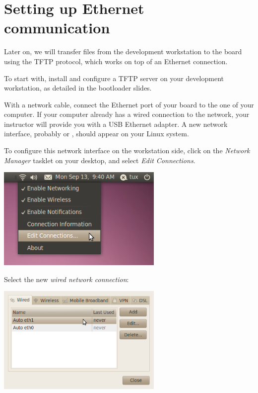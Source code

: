 \section{Setting up Ethernet communication}

Later on, we will transfer files from the development workstation to
the board using the TFTP protocol, which works on top of an Ethernet
connection.

To start with, install and configure a TFTP server on your development
workstation, as detailed in the bootloader slides.

With a network cable, connect the Ethernet port of your board to the
one of your computer. If your computer already has a wired connection
to the network, your instructor will provide you with a USB Ethernet
adapter. A new network interface, probably  or ,
should appear on your Linux system.

To configure this network interface on the workstation side, click on
the {\em Network Manager} tasklet on your desktop, and select {\em
  Edit Connections}.

\begin{center}
\includegraphics[width=8cm]{labs/sysdev-u-boot/network-config-1.png}
\end{center}

Select the new {\em wired network connection}:

\begin{center}
\includegraphics[width=8cm]{labs/sysdev-u-boot/network-config-2.png}
\end{center}

